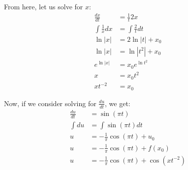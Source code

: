 \begin{enumerate}
  From here, let us solve for $x$:
  \begin{align}
    \frac{dx}{dt} & = \frac{1}{t} 2x\\
    \int \frac{1}{x} dx & = \int \frac{2}{t} dt\\
    \ln |x| & = 2 \ln |t| + x_0\\
    \ln |x| & = \ln |t^2| + x_0\\
    e^{\ln |x|} & = x_0 e^{\ln t^2}\\
    x & = x_0 t^2\\
    x t^{-2} & = x_0
  \end{align}

  Now, if we consider solving for $\frac{du}{dt}$, we get:
  \begin{align}
    \frac{du}{dt} & = \sin (\pi t)\\
    \int du & = \int \sin (\pi t) dt\\
    u & = - \frac{1}{\pi} \cos (\pi t) + u_0\\
    u & = - \frac{1}{\pi} \cos (\pi t) + f(x_0)\\
    u & = - \frac{1}{\pi} \cos (\pi t) + \cos\left(x t^{-2}\right)
  \end{align}
\end{enumerate}
